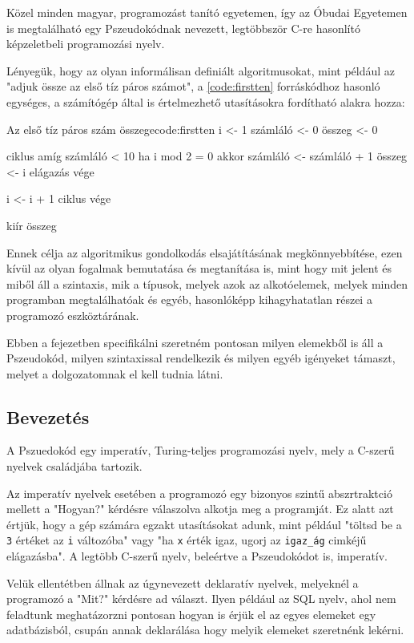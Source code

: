 Közel minden magyar, programozást tanító egyetemen, így az Óbudai Egyetemen is megtalálható egy Pszeudokódnak nevezett, legtöbbször C-re hasonlító képzeletbeli programozási nyelv. 

Lényegük, hogy az olyan informálisan definiált algoritmusokat, mint például az "adjuk össze az első tíz páros számot", a \ref{code:firstten} forráskódhoz hasonló egységes, a számítógép által is értelmezhető utasításokra fordítható alakra hozza:

\begin{code}{Az első tíz páros szám összege}{code:firstten}
i <- 1
számláló <- 0
összeg <- 0

ciklus amíg számláló < 10
    ha i mod 2 = 0 akkor
        számláló <- számláló + 1
        összeg <- i
    elágazás vége

    i <- i + 1
ciklus vége

kiír összeg
\end{code}

Ennek célja az algoritmikus gondolkodás elsajátításának megkönnyebbítése, ezen kívül az olyan fogalmak bemutatása és megtanítása is, mint hogy mit jelent és miből áll a szintaxis, mik a típusok, melyek azok az alkotóelemek, melyek minden programban megtalálhatóak és egyéb, hasonlóképp kihagyhatatlan részei a programozó eszköztárának.

Ebben a fejezetben specifikálni szeretném pontosan milyen elemekből is áll a Pszeudokód, milyen szintaxissal rendelkezik és milyen egyéb igényeket támaszt, melyet a dolgozatomnak el kell tudnia látni.

\subsection{Bevezetés}

A Pszuedokód egy imperatív, Turing-teljes programozási nyelv, mely a C-szerű nyelvek családjába tartozik.

Az imperatív nyelvek esetében a programozó egy bizonyos szintű abszrtraktció mellett a "Hogyan?" kérdésre válaszolva alkotja meg a programját. Ez alatt azt értjük, hogy a gép számára egzakt utasításokat adunk, mint például "töltsd be a \texttt{3} értéket az \texttt{i} változóba" vagy "ha \texttt{x} érték igaz, ugorj az \texttt{igaz\_ág} cimkéjű elágazásba". A legtöbb C-szerű nyelv, beleértve a Pszeudokódot is, imperatív.

Velük ellentétben állnak az úgynevezett deklaratív nyelvek, melyeknél a programozó a "Mit?" kérdésre ad választ. Ilyen például az SQL nyelv, ahol nem feladtunk meghatázorzni pontosan hogyan is érjük el az egyes elemeket egy adatbázisból, csupán annak deklarálása hogy melyik elemeket szeretnénk lekérni.


